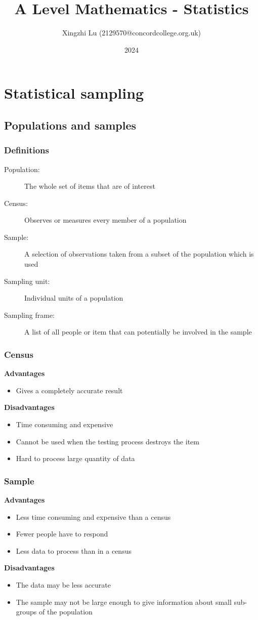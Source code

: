 \documentclass[A4paper]{article}
\title{A Level Mathematics - Statistics}
\author{Xingzhi Lu (2129570@concordcollege.org.uk)}
\date{2024}
\begin{document}
	\maketitle
	\section{Statistical sampling}
	\subsection{Populations and samples}
	\subsubsection{Definitions}
	\begin{description}
		\item[Population:] The whole set of items that are of interest
		\item[Census:] Observes or measures every member of a population
		\item[Sample:] A selection of observations taken from a subset of the population which is used
		\item[Sampling unit:] Individual units of a population
		\item[Sampling frame:] A list of all people or item that can potentially be involved in the sample
	\end{description}
	
	\subsubsection{Census}
	\textbf{Advantages}
	\begin{itemize}
		\item Gives a completely accurate result
	\end{itemize}
	\textbf{Disadvantages}
	\begin{itemize}
		\item Time consuming and expensive
		\item Cannot be used when the testing process destroys the item
		\item Hard to process large quantity of data
	\end{itemize}
	\subsubsection{Sample}
	\textbf{Advantages}
	\begin{itemize}
		\item Less time consuming and expensive than a census
		\item Fewer people have to respond
		\item Less data to process than in a census
	\end{itemize}
	\textbf{Disadvantages}
	\begin{itemize}
		\item The data may be less accurate
		\item The sample may not be large enough to give information about small sub-groups of the population
	\end{itemize}
	
\end{document}
